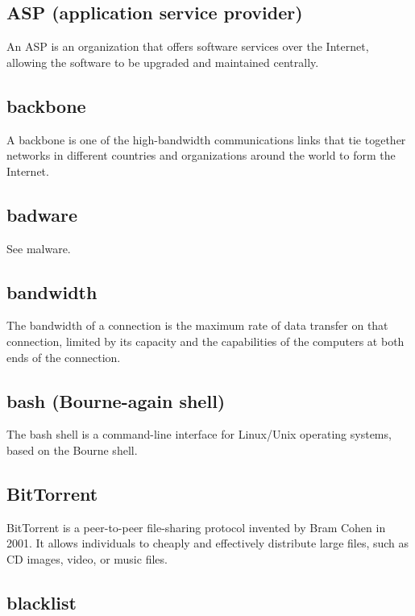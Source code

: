 \subsection{ASP (application service provider)}

An ASP is an organization that offers software services over the
Internet, allowing the software to be upgraded and maintained centrally.

\subsection{backbone}

A backbone is one of the high-bandwidth communications links that tie
together networks in different countries and organizations around the
world to form the Internet.

\subsection{badware}

See malware.

\subsection{bandwidth}

The bandwidth of a connection is the maximum rate of data transfer on
that connection, limited by its capacity and the capabilities of the
computers at both ends of the connection.

\subsection{bash (Bourne-again shell)}

The bash shell is a command-line interface for Linux/Unix operating
systems, based on the Bourne shell.

\subsection{BitTorrent}

BitTorrent is a peer-to-peer file-sharing protocol invented by Bram
Cohen in 2001. It allows individuals to cheaply and effectively
distribute large files, such as CD images, video, or music files.

\subsection{blacklist}

